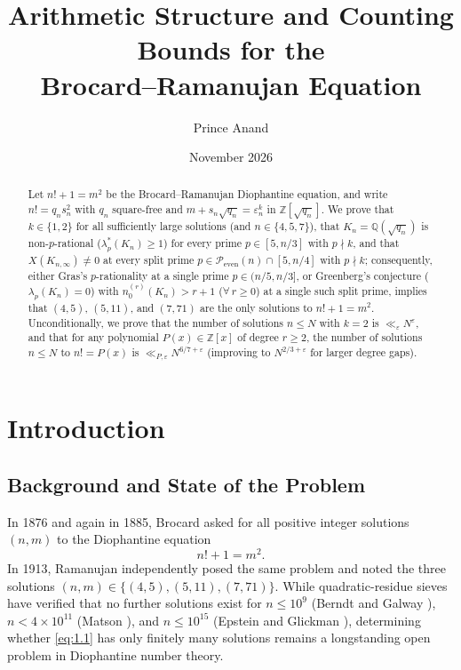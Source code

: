 \documentclass[11pt,reqno]{amsart}
\title[Arithmetic Structure and Counting Bounds for the Brocard--Ramanujan Equation]{Arithmetic Structure and Counting Bounds for the\\ Brocard--Ramanujan Equation}
\author{Prince Anand}
\date{November 2026}
\theoremstyle{remark}
\numberwithin{equation}{section}
\newcommand{\Z}{\mathbb{Z}}
\newcommand{\Q}{\mathbb{Q}}
\newcommand{\Peven}{\mathcal{P}_{\mathrm{even}}}
\begin{document}
\begin{abstract}
Let $n! + 1 = m^2$ be the Brocard--Ramanujan Diophantine equation, and write $n! = q_n s_n^2$ with $q_n$ square-free and $m + s_n\sqrt{q_n} = \varepsilon_n^k$ in $\Z[\sqrt{q_n}]$. We prove that $k \in \{1, 2\}$ for all sufficiently large solutions (and $n \in \{4, 5, 7\}$), that $K_n = \Q(\sqrt{q_n})$ is non-$p$-rational ($\lambda_p^*(K_n) \ge 1$) for every prime $p \in [5, n/3]$ with $p \nmid k$, and that $X(K_{n,\infty}) \ne 0$ at every split prime $p \in \Peven(n) \cap [5, n/4]$ with $p \nmid k$; consequently, either Gras's $p$-rationality at a single prime $p \in (n/5, n/3]$, or Greenberg's conjecture ($\lambda_p(K_n) = 0$) with $n_0^{(r)}(K_n) > r + 1$ ($\forall\, r \ge 0$) at a single such split prime, implies that $(4, 5)$, $(5, 11)$, and $(7, 71)$ are the only solutions to $n! + 1 = m^2$. Unconditionally, we prove that the number of solutions $n \le N$ with $k = 2$ is $\ll_\varepsilon N^\varepsilon$, and that for any polynomial $P(x) \in \Z[x]$ of degree $r \ge 2$, the number of solutions $n \le N$ to $n! = P(x)$ is $\ll_{P,\varepsilon} N^{6/7+\varepsilon}$ (improving to $N^{2/3+\varepsilon}$ for larger degree gaps).
\end{abstract}

\maketitle

\section{Introduction}

\subsection{Background and State of the Problem}
In 1876 and again in 1885, Brocard \cite{Brocard1876,Brocard1885} asked for all positive integer solutions $(n, m)$ to the Diophantine equation
\begin{equation}\label{eq:1.1}
n! + 1 = m^2.
\end{equation}
In 1913, Ramanujan \cite{Ramanujan1913} independently posed the same problem and noted the three solutions $(n, m) \in \{(4, 5), (5, 11), (7, 71)\}$. While quadratic-residue sieves have verified that no further solutions exist for $n \le 10^9$ (Berndt and Galway \cite{BerndtGalway2000}), $n < 4 \times 10^{11}$ (Matson \cite{Matson2017}), and $n \le 10^{15}$ (Epstein and Glickman \cite{EpsteinGlickman2020}), determining whether \eqref{eq:1.1} has only finitely many solutions remains a longstanding open problem in Diophantine number theory.
\end{document}
